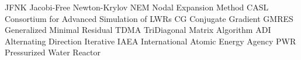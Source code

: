 \makeglossaries

    {JFNK}    {Jacobi-Free Newton-Krylov}
     {NEM}     {Nodal Expansion Method}
    {CASL}    {Consortium for Advanced Simulation of LWRs}
      {CG}      {Conjugate Gradient}
   {GMRES}   {Generalized Minimal Residual}
    {TDMA}    {TriDiagonal Matrix Algorithm}
     {ADI}     {Alternating Direction Iterative}
    {IAEA}    {International Atomic Energy Agency}
     {PWR}     {Pressurized Water Reactor}
